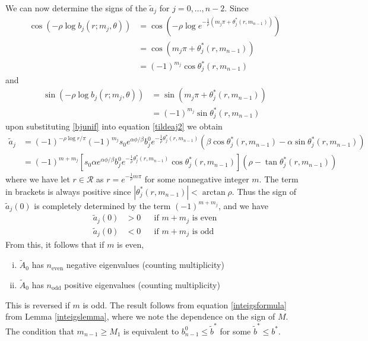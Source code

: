 \documentclass[thesis.tex]{subfiles}
\begin{document}
We can now determine the signs of the $\tilde{a}_j$ for $j = 0, \dots, n-2$. Since
\begin{align*}
\cos\left( -\rho \log b_j(r; m_j, \theta) \right) 
&= \cos\left( -\rho \log e^{ -\frac{1}{\rho}(m_j \pi + \theta^*_j(r, m_{n-1})) } \right) \\
&= \cos\left( m_j \pi + \theta^*_j(r, m_{n-1})\right) \\
&= (-1)^{m_j} \cos \theta^*_j(r, m_{n-1})
\end{align*}
and
\begin{align*}
\sin\left( -\rho \log b_j(r; m_j, \theta) \right) 
&= \sin\left( m_j \pi + \theta^*_j(r, m_{n-1})\right) \\
&= (-1)^{m_j} \sin \theta^*_j(r, m_{n-1})
\end{align*}
upon substituting \eqref{bjunif} into equation \eqref{tildeaj2} we obtain
\begin{align*}
\tilde{a}_j 
&= (-1)^{-\rho \log r / \pi} (-1)^{m_j} s_0 e^{\alpha \phi/\beta} b_j^0 e^{ -\frac{1}{\rho} \theta^*_j(r, m_{n-1}) } \left( \beta \cos\theta^*_j(r, m_{n-1}) - \alpha \sin \theta^*_j(r, m_{n-1}) \right) \\
&= (-1)^{m + m_j} \left[ s_0 \alpha e^{\alpha \phi/\beta} b_j^0 e^{ -\frac{1}{\rho} \theta^*_j(r, m_{n-1}) } \cos\theta^*_j(r, m_{n-1}) \right] \left( \rho - \tan \theta^*_j(r, m_{n-1}) \right)
\end{align*}
where we have let $r \in \mathcal{R}$ as $r = e^{-\frac{1}{\rho}m \pi}$ for some nonnegative integer $m$. The term in brackets is always positive since $|\theta^*_j(r, m_{n-1})| < \arctan \rho$. Thus the sign of $\tilde{a}_j(0)$ is completely determined by the term $(-1)^{m + m_j}$, and we have
\begin{align*}
\tilde{a}_j(0) &> 0 && \text{if } m + m_j \text{ is even} \\
\tilde{a}_j(0) &< 0 && \text{if } m + m_j \text{ is odd}
\end{align*}
From this, it follows that if $m$ is even,
\begin{enumerate}[(i)]
\item $\tilde{A}_0$ has $n_{\text{even}}$ negative eigenvalues (counting multiplicity)
\item $\tilde{A}_0$ has $n_{\text{odd}}$ positive eigenvalues (counting multiplicity)
\end{enumerate}
This is reversed if $m$ is odd. The result follows from equation \eqref{inteigsformula} from Lemma \ref{inteigslemma}, where we note the dependence on the sign of $M$. The condition that $m_{n-1} \geq M_1$ is equivalent to $b_{n-1}^0 \leq \tilde{b}^*$ for some $\tilde{b}^* \leq b^*$.
\end{document}
